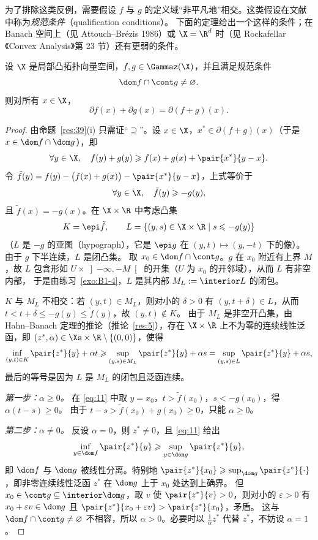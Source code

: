 为了排除这类反例，需要假设 $f$ 与 $g$ 的定义域“非平凡地”相交。这类假设在文献中称为\emph{规范条件}（qualification conditions）。
下面的定理给出一个这样的条件；在 Banach 空间上（见 Attouch--Brézis 1986）或 $\X=\R^d$ 时（见 Rockafellar《Convex Analysis》第 23 节）还有更弱的条件。

\begin{theorem}
\label{res:40}
设 $\X$ 是局部凸拓扑向量空间，$f,g\in\Gammaz(\X)$，并且满足规范条件
\[
  \dom f\cap\cont g\neq\varnothing .
\]
则对所有 $x\in\X$，
\[
  \partial f(x)+\partial g(x)=\partial(f+g)(x).
\]
\end{theorem}

\begin{proof}
由命题~\ref{res:39}(i) 只需证“$\supseteq$”。设 $x\in\X$，$x^*\in\partial(f+g)(x)$（于是 $x\in\dom f\cap\dom g$），即
\[
  \forall y\in\X,\quad f(y)+g(y)\geqslant f(x)+g(x)+\pair{x^*}{y-x}.
\]
令 $\tilde f(y)=f(y)-\bigl(f(x)+g(x)\bigr)-\pair{x^*}{y-x}$，上式等价于
\[
  \forall y\in\X,\quad\tilde f(y)\geqslant-g(y),
\]
且 $\tilde f(x)=-g(x)$。在 $\X\times\R$ 中考虑凸集
\[
  K=\epi\tilde f,\qquad L=\{(y,s)\in\X\times\R\mid s\leqslant-g(y)\}
\]
（$L$ 是 $-g$ 的亚图（hypograph），它是 $\epi g$ 在 $(y,t)\mapsto(y,-t)$ 下的像）。由于 $g$ 下半连续，$L$ 是闭凸集。
取 $x_0\in\dom f\cap\cont g$。$g$ 在 $x_0$ 附近有上界 $M$，故 $L$ 包含形如 $U\times\left]-\infty,-M\right[$ 的开集（$U$ 为 $x_0$ 的开邻域），从而 $L$ 有非空内部，
于是由练习~\ref{exo:B1-4}，$L$ 是其内部 $M_L:=\interior L$ 的闭包。

$K$ 与 $M_L$ 不相交：若 $(y,t)\in M_L$，则对小的 $\delta>0$ 有 $(y,t+\delta)\in L$，从而 $t<t+\delta\leqslant-g(y)\leqslant\tilde f(y)$，故 $(y,t)\notin K$。
由于 $M_L$ 是非空开凸集，由 Hahn--Banach 定理的推论（推论~\ref{res:5}），存在 $\X\times\R$ 上不为零的连续线性泛函，即 $(z^*,\alpha)\in\Xs\times\R\setminus\{(0,0)\}$，使得
\begin{equation}
  \inf_{(y,t)\in K}\pair{z^*}{y}+\alpha t\geqslant\sup_{(y,s)\in M_L}\pair{z^*}{y}+\alpha s=\sup_{(y,s)\in L}\pair{z^*}{y}+\alpha s ,
  \label{eq:11}
\end{equation}
最后的等号是因为 $L$ 是 $M_L$ 的闭包且泛函连续。

\emph{第一步：$\alpha\geqslant0$。} 在 \eqref{eq:11} 中取 $y=x_0$，$t>\tilde f(x_0)$，$s<-g(x_0)$，得 $\alpha(t-s)\geqslant0$。
由于 $t-s>\tilde f(x_0)+g(x_0)\geqslant0$，只能 $\alpha\geqslant0$。

\emph{第二步：$\alpha\neq0$。} 反设 $\alpha=0$，则 $z^*\neq0$，且 \eqref{eq:11} 给出
\[
  \inf_{y\in\dom f}\pair{z^*}{y}\geqslant\sup_{y\in\dom g}\pair{z^*}{y},
\]
即 $\dom f$ 与 $\dom g$ 被线性分离。特别地 $\pair{z^*}{x_0}\geqslant\sup_{\dom g}\pair{z^*}{\cdot}$，即非零连续线性泛函 $z^*$ 在 $\dom g$ 上于 $x_0$ 处达到上确界。
但 $x_0\in\cont g\subseteq\interior\dom g$，取 $v$ 使 $\pair{z^*}{v}>0$，则对小的 $\varepsilon>0$ 有 $x_0+\varepsilon v\in\dom g$ 且 $\pair{z^*}{x_0+\varepsilon v}>\pair{z^*}{x_0}$，矛盾。
这与 $\dom f\cap\cont g\neq\varnothing$ 不相容，所以 $\alpha>0$。必要时以 $\frac1\alpha z^*$ 代替 $z^*$，不妨设 $\alpha=1$。


\end{proof}
